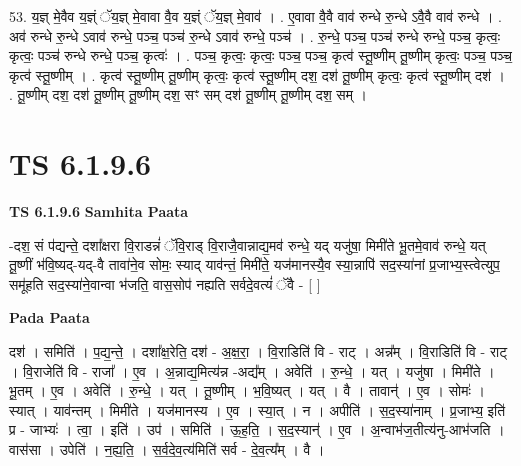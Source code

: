 \documentclass[17pt]{extarticle}
\begin{document}
53. य॒ज्ञ् मे॒वैव य॒ज्ञ्ं ॅय॒ज्ञ् मे॒वावा वै॒व य॒ज्ञ्ं ॅय॒ज्ञ् मे॒वाव॑ । . ए॒वावा वै॒वै वाव॑ रुन्धे रु॒न्धे ऽवै॒वै वाव॑ रुन्धे । . अव॑ रुन्धे रु॒न्धे ऽवाव॑ रुन्धे॒ पञ्च॒ पञ्च॑ रु॒न्धे ऽवाव॑ रुन्धे॒ पञ्च॑ । . रु॒न्धे॒ पञ्च॒ पञ्च॑ रुन्धे रुन्धे॒ पञ्च॒ कृत्वः॒ कृत्वः॒ पञ्च॑ रुन्धे रुन्धे॒ पञ्च॒ कृत्वः॑ । . पञ्च॒ कृत्वः॒ कृत्वः॒ पञ्च॒ पञ्च॒ कृत्व॑ स्तू॒ष्णीम् तू॒ष्णीम् कृत्वः॒ पञ्च॒ पञ्च॒ कृत्व॑ स्तू॒ष्णीम् । . कृत्व॑ स्तू॒ष्णीम् तू॒ष्णीम् कृत्वः॒ कृत्व॑ स्तू॒ष्णीम् दश॒ दश॑ तू॒ष्णीम् कृत्वः॒ कृत्व॑ स्तू॒ष्णीम् दश॑ । . तू॒ष्णीम् दश॒ दश॑ तू॒ष्णीम् तू॒ष्णीम् दश॒ सꣳ सम् दश॑ तू॒ष्णीम् तू॒ष्णीम् दश॒ सम् । \newline
\pagebreak
{}

\section{ TS 6.1.9.6 }

\textbf{TS 6.1.9.6 } \newline
\textbf{Samhita Paata} \newline

-दश॒ सं प॑द्यन्ते॒ दशा᳚क्षरा वि॒राडन्नं॑ ॅवि॒राड् वि॒राजै॒वान्नाद्य॒मव॑ रुन्धे॒ यद् यजु॑षा॒ मिमी॑ते भू॒तमे॒वाव॑ रुन्धे॒ यत् तू॒ष्णीं भ॑वि॒ष्यद्-यद्-वै तावा॑ने॒व सोमः॒ स्याद् याव॑न्तं॒ मिमी॑ते॒ यज॑मानस्यै॒व स्या॒न्नापि॑ सद॒स्या॑नां प्र॒जाभ्य॒स्त्वेत्युप॒ समू॑हति सद॒स्या॑ने॒वान्वा भ॑जति॒ वास॒सोप॑ नह्यति सर्वदे॒वत्यं॑ ॅवै - [  ] \newline

\textbf{Pada Paata} \newline

दश॑ । समिति॑ । प॒द्य॒न्ते॒ । दशा᳚क्ष॒रेति॒ दश॑ - अ॒क्ष॒रा॒ । वि॒राडिति॑ वि - राट् । अन्न᳚म् । वि॒राडिति॑ वि - राट् । वि॒राजेति॑ वि - राजा᳚ । ए॒व । अ॒न्नाद्य॒मित्य॑न्न -अद्य᳚म् । अवेति॑ । रु॒न्धे॒ । यत् । यजु॑षा । मिमी॑ते । भू॒तम् । ए॒व । अवेति॑ । रु॒न्धे॒ । यत् । तू॒ष्णीम् । भ॒वि॒ष्यत् । यत् । वै । तावान्॑ । ए॒व । सोमः॑ । स्यात् । याव॑न्तम् । मिमी॑ते । यज॑मानस्य । ए॒व । स्या॒त् । न । अपीति॑ । स॒द॒स्या॑नाम् । प्र॒जाभ्य॒ इति॑ प्र - जाभ्यः॑ । त्वा॒ । इति॑ । उप॑ । समिति॑ । ऊ॒ह॒ति॒ । स॒द॒स्यान्॑ । ए॒व । अ॒न्वाभ॑ज॒तीत्य॑नु-आभ॑जति । वास॑सा । उपेति॑ । न॒ह्य॒ति॒ । स॒र्व॒दे॒व॒त्य॑मिति॑ सर्व - दे॒व॒त्य᳚म् । वै ।  \newline
\end{document}
